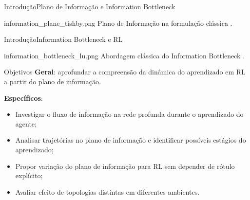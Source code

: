 \documentclass[
11pt,notheorems,hyperref={pdfauthor=Autor}
]{beamer}
\begin{document}
\begin{frame}{Introdução}{Plano de Informação e Information Bottleneck ~\textcite{shwartz-ziv_opening_2017}}
    \pause
    \centering
    \begin{minipage}{0.7\textwidth}
        \FigureWithFallbackCaption
        {information_plane_tishby.png}
        {Plano de Informação na formulação clássica \parencite{shwartz-ziv_opening_2017}.}
    \end{minipage}
\end{frame}

\begin{frame}{Introdução}{Information Bottleneck e RL \textcite{fan_dribo_2022}}
    \pause
    \centering
    \begin{minipage}{0.7\textwidth}
        \FigureWithFallbackCaption
        {information_bottleneck_lu.png}
        {Abordagem clássica do Information Bottleneck \parencite{shwartz-ziv_opening_2017}.}
    \end{minipage}
\end{frame}

\begin{frame}{Objetivos}
    \pause
    \textbf{Geral}: aprofundar a compreensão da dinâmica do aprendizado em RL a partir do plano de informação.

    \pause
    \textbf{Específicos}:
\begin{itemize}
    \item Investigar o fluxo de informação na rede profunda durante o aprendizado do agente;
    \pause
    \item Analisar trajetórias no plano de informação e identificar possíveis estágios do aprendizado;
    \pause
    \item Propor variação do plano de informação para RL sem depender de rótulo explícito;
    \pause
    \item Avaliar efeito de topologias distintas em diferentes ambientes.
\end{itemize}
\end{frame}
\end{document}
